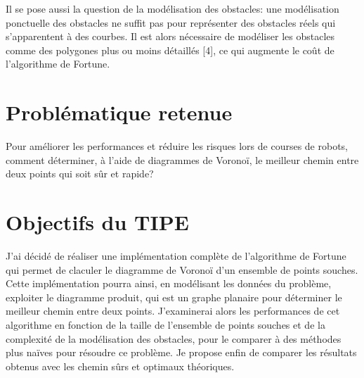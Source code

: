 \documentclass[a4paper]{article}
\begin{document}
Il se pose aussi la question de la modélisation des obstacles: une modélisation ponctuelle des obstacles ne suffit pas pour représenter des obstacles réels qui s'apparentent à des courbes. Il est alors nécessaire de modéliser les obstacles comme des polygones plus ou moins détaillés [4], ce qui augmente le coût de l'algorithme de Fortune.


\section*{Problématique retenue}
Pour améliorer les performances et réduire les risques lors de courses de robots, comment déterminer, à l'aide de diagrammes de Voronoï, le meilleur chemin entre deux points qui soit sûr et rapide?


\section*{Objectifs du TIPE}
J'ai décidé de réaliser une implémentation complète de l'algorithme de Fortune qui permet de claculer le diagramme de Voronoï d'un ensemble de points souches.
Cette implémentation pourra ainsi, en modélisant les données du problème, exploiter le diagramme produit, qui est un graphe planaire pour déterminer le meilleur chemin entre deux points.
J'examinerai alors les performances de cet algorithme en fonction de la taille de l'ensemble de points souches et de la complexité de la modélisation des obstacles, pour le comparer à des méthodes plus naïves pour résoudre ce problème.
Je propose enfin de comparer les résultats obtenus avec les chemin sûrs et optimaux théoriques.
\end{document}
